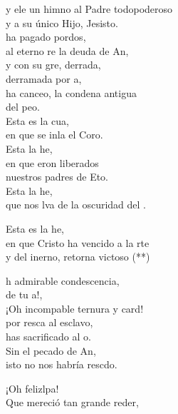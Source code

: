 \begin{cancion}
	y ele un himno al Padre todopoderoso\\
	y a su único Hijo, Jesisto.\\
	\jump
	 ha pagado pordos,\\
	al eterno re la deuda de An,\\
	y con su gre, derrada,\\
	derramada por a,\\
	ha canceo, la condena antigua\\
	del peo.\\
	\jump
	Esta es la cua,\\
	en que se inla el Coro.\\
	Esta  la he,\\
	en que eron liberados\\
	nuestros padres de Eto.\\
	Esta  la he,\\
	que nos lva de la oscuridad del .\jump\\
	\begin{chorus}%
		Esta es la he,\\
		en que Cristo ha vencido a la rte\\
		y del inerno, retorna victoso (**)\jump\\
	\end{chorus}%
	h admirable condescencia,\\
	de tu a!,\\
	¡Oh incompable ternura y card!\\
	por resca al esclavo,\\
	has sacrificado al o.\\
	Sin el pecado de An,\\
	isto no nos habría rescdo.\jump\\
	\begin{chorus}%
		¡Oh felizlpa!\\
		Que mereció tan grande rede\chord{Sol}{}{nto}r,\\

\end{chorus}
\end{cancion}
